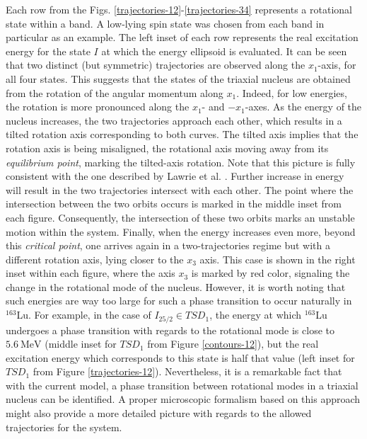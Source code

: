\documentclass[myclassdoc,debug]{rjparticle}
\begin{document}
Each row from the Figs. \ref{trajectories-12}-\ref{trajectories-34} represents a rotational state within a band. A low-lying spin state was chosen from each band in particular as an example. The left inset of each row represents the real excitation energy for the state $I$ at which the energy ellipsoid is evaluated. It can be seen that two distinct (but symmetric) trajectories are observed along the $x_1$-axis, for all four states. This suggests that the states of the triaxial nucleus are obtained from the rotation of the angular momentum along $x_1$. Indeed, for low energies, the rotation is more pronounced along the $x_1$- and $-x_1$-axes. As the energy of the nucleus increases, the two trajectories approach each other, which results in a tilted rotation axis corresponding to both curves. The tilted axis implies that the rotation axis is being misaligned, the rotational axis moving away from its \emph{equilibrium point}, marking the tilted-axis rotation. Note that this picture is fully consistent with the one described by Lawrie et al. \cite{lawrie2020tilted}. Further increase in energy will result in the two trajectories intersect with each other. The point where the intersection between the two orbits occurs is marked in the middle inset from each figure. Consequently, the intersection of these two orbits marks an unstable motion within the system. Finally, when the energy increases even more, beyond this \emph{critical point}, one arrives again in a two-trajectories regime but with a different rotation axis, lying closer to the $x_3$ axis. This case is shown in the right inset within each figure, where the axis $x_3$ is marked by red color, signaling the change in the rotational mode of the nucleus. However, it is worth noting that such energies are way too large for such a phase transition to occur naturally in $^{163}$Lu. For example, in the case of $I_{25/2}\in TSD_1$, the energy at which $^{163}$Lu undergoes a phase transition with regards to the rotational mode is close to $5.6\ \text{MeV}$ (middle inset for $TSD_1$ from Figure \ref{contours-12}), but the real excitation energy which corresponds to this state is half that value (left inset for $TSD_1$ from Figure \ref{trajectories-12}). Nevertheless, it is a remarkable fact that with the current model, a phase transition between rotational modes in a triaxial nucleus can be identified. A proper microscopic formalism based on this approach might also provide a more detailed picture with regards to the allowed trajectories for the system.
\end{document}
